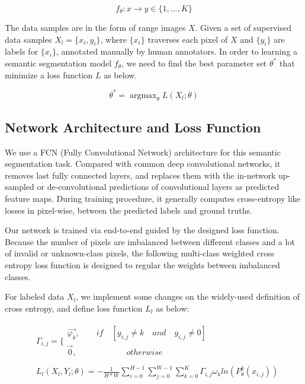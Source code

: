 \begin{equation}
f_{\theta}: x\to y \in \{1,...,K\}
\end{equation}

The data samples are in the form of range images $X$. Given a set of supervised data samples $X_l=\{x_i, y_i\}$, where $\{x_i\}$ traverses each pixel of $X$ and $\{y_i\}$ are labels for $\{x_i\}$, annotated manually by human annotators. 
In order to learning a semantic segmentation model $f_\theta$, we need to find the best parameter set $\theta^*$ that minimize a loss function $L$ as below.

\begin{equation}
\theta^{*}=\mathop{\arg\max}_{\theta}L(X_l; \theta)
\end{equation}

\subsection{Network Architecture and Loss Function}
We use a FCN (Fully Convolutional Network) architecture for this semantic segmentation task.
Compared with common deep convolutional networks, it removes last fully connected layers, and replaces them with the in-network up-sampled or de-convolutional predictions of convolutional layers as predicted feature maps. During training procedure, it generally computes cross-entropy like losses in pixel-wise, between the predicted labels and ground truths.

Our network is trained via end-to-end guided by the designed loss function. Because the number of pixels are imbalanced between different classes and a lot of invalid or unknown-class pixels, the following multi-class weighted cross entropy loss function is designed to regular the weights between imbalanced classes.

For labeled data $X_l$, we implement some changes on the widely-used definition of cross entropy, and define loss function $L_l$ as below:

\begin{equation}
\begin{split}
&\varGamma_{i,j}=\{
	\begin{array}{lr}
	\overrightarrow{\varphi_k} ,\quad\quad if \quad [y_{i,j}\neq k \quad and\quad y_{i,j}\neq0]	\\
	\overrightarrow{0} ,\quad\quad\quad\quad\quad\quad  otherwise
	\end{array}	\\
	\\
&\textit{}L_l(X_l,Y_l;\theta)=-\frac{1}{H*W}\sum_{i=0}^{H-1}\sum_{j=0}^{W-1}\sum_{k=0}^K{\varGamma_{i,j}\omega_{k}ln(P^k_{\theta}(x_{i,j}))}
\end{split}
\end{equation}

